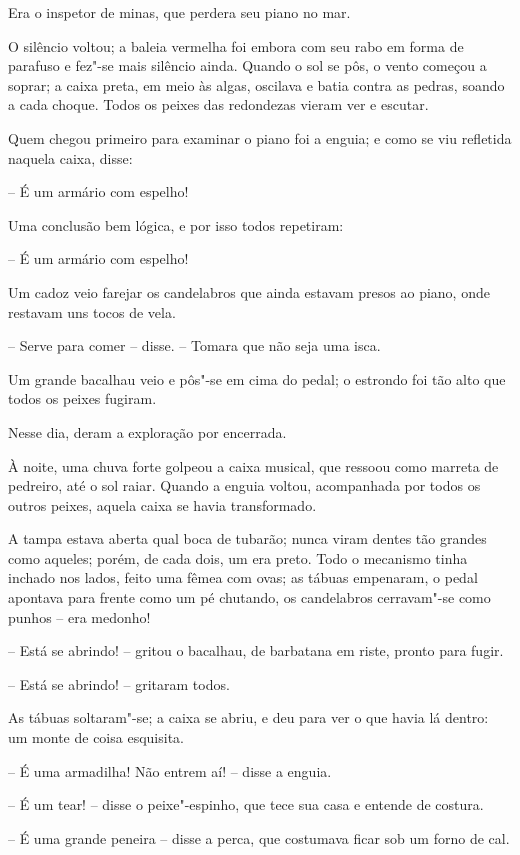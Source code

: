 Era o inspetor de minas, que perdera seu piano no mar.

O silêncio voltou; a baleia vermelha foi embora com seu rabo em forma de
parafuso e fez"-se mais silêncio ainda. Quando o sol se pôs, o vento
começou a soprar; a caixa preta, em meio às algas, oscilava e batia
contra as pedras, soando a cada choque. Todos os peixes das redondezas
vieram ver e escutar. 

Quem chegou primeiro para examinar o piano foi a enguia; e como se viu
refletida naquela caixa, disse:

-- É um armário com espelho!

Uma conclusão bem lógica, e por isso todos repetiram:

-- É um armário com espelho!

Um cadoz veio farejar os candelabros que ainda estavam presos ao piano,
onde restavam uns tocos de vela. 

-- Serve para comer -- disse. -- Tomara que não seja uma isca.

Um grande bacalhau veio e pôs"-se em cima do pedal; o estrondo foi tão
alto que todos os peixes fugiram. 

Nesse dia, deram a exploração por encerrada.

À noite, uma chuva forte golpeou a caixa musical, que ressoou como
marreta de pedreiro, até o sol raiar. Quando a enguia voltou,
acompanhada por todos os outros peixes, aquela caixa se havia
transformado. 

A tampa estava aberta qual boca de tubarão; nunca viram dentes tão
grandes como aqueles; porém, de cada dois, um era preto. Todo o
mecanismo tinha inchado nos lados, feito uma fêmea com ovas; as tábuas
empenaram, o pedal apontava para frente como um pé chutando, os
candelabros cerravam"-se como punhos -- era medonho!

-- Está se abrindo! -- gritou o bacalhau, de barbatana em riste, pronto
para fugir.

-- Está se abrindo! -- gritaram todos. 

As tábuas soltaram"-se; a caixa se abriu, e deu para ver o que havia lá
dentro: um monte de coisa esquisita.

-- É uma armadilha! Não entrem aí! -- disse a enguia.

-- É um tear! -- disse o peixe"-espinho, que tece sua casa e entende de
costura. 

-- É uma grande peneira -- disse a perca, que costumava ficar sob um forno
de cal. 

